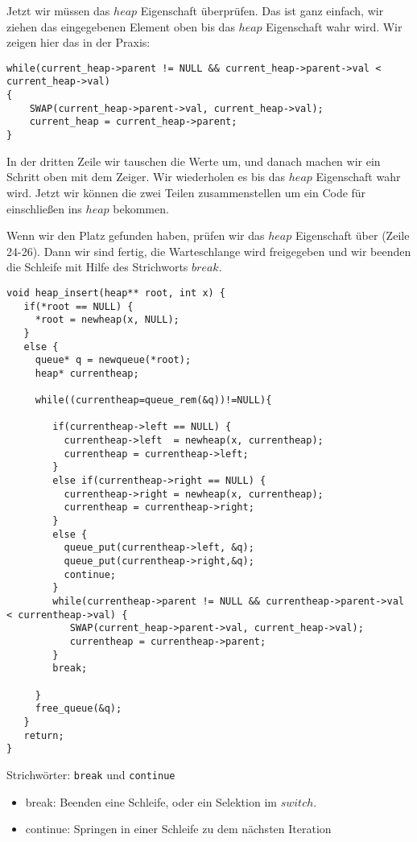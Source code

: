 Jetzt wir müssen das $heap$ Eigenschaft überprüfen. Das ist ganz einfach, 
wir ziehen das eingegebenen Element oben bis das $heap$ Eigenschaft wahr wird.
Wir zeigen hier das in der Praxis:
\begin{lstlisting}
while(current_heap->parent != NULL && current_heap->parent->val < current_heap->val) 
{
    SWAP(current_heap->parent->val, current_heap->val);
    current_heap = current_heap->parent;
}
\end{lstlisting} 
In der dritten Zeile wir tauschen die Werte um, und danach machen
wir ein Schritt oben mit dem Zeiger. Wir wiederholen es bis
das $heap$ Eigenschaft wahr wird. Jetzt wir können die zwei Teilen
zusammenstellen um ein Code für einschließen ins $heap$ bekommen.

Wenn wir den Platz gefunden haben, prüfen wir das $heap$ Eigenschaft über
(Zeile 24-26). Dann wir sind fertig, die Warteschlange wird freigegeben und
wir beenden die Schleife mit Hilfe des Strichworts $break$.
\begin{lstlisting}
void heap_insert(heap** root, int x) {
   if(*root == NULL) {
     *root = newheap(x, NULL);
   }
   else {
     queue* q = newqueue(*root);
     heap* currentheap;

     while((currentheap=queue_rem(&q))!=NULL){

        if(currentheap->left == NULL) {
          currentheap->left  = newheap(x, currentheap);
          currentheap = currentheap->left;
        }
        else if(currentheap->right == NULL) {
          currentheap->right = newheap(x, currentheap);
          currentheap = currentheap->right;
        }
        else {
          queue_put(currentheap->left, &q);
          queue_put(currentheap->right,&q);
          continue;
        }
        while(currentheap->parent != NULL && currentheap->parent->val < currentheap->val) {
           SWAP(current_heap->parent->val, current_heap->val);
           currentheap = currentheap->parent;
        }
        break;

     }
     free_queue(&q);
   }
   return;
}
\end{lstlisting}
\begin{myexampleblock}{Strichwörter: \texttt{break} und \texttt{continue}}
\begin{itemize}
\item break: Beenden eine Schleife, oder ein Selektion im $switch$.
\item continue: Springen in einer Schleife zu dem nächsten Iteration
\end{itemize}
\end{myexampleblock}
